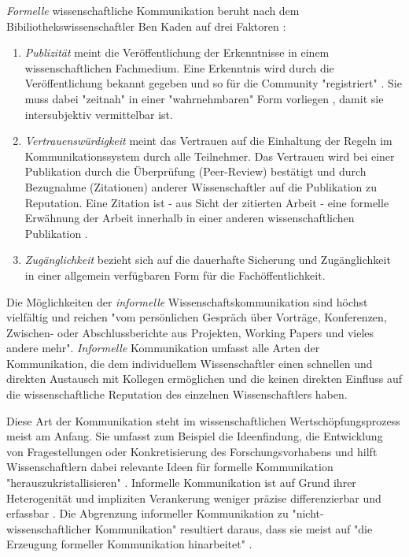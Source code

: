 \textit{Formelle} wissenschaftliche Kommunikation beruht nach dem Bibiliothekswissenschaftler Ben Kaden auf drei Faktoren \cite{kaden_2009_library}:
\begin{enumerate}
\item \textit{Publizität} meint die Veröffentlichung der Erkenntnisse in einem wissenschaftlichen Fachmedium. Eine Erkenntnis wird durch die Veröffentlichung bekannt gegeben und so für die Community "registriert" \cite{kaden_2009_library}. Sie muss dabei "zeitnah" in einer "wahrnehmbaren" Form vorliegen \cite{Schimank_2012}, damit sie intersubjektiv vermittelbar ist.
\item \textit{Vertrauenswürdigkeit} meint das Vertrauen auf die Einhaltung der Regeln im Kommunikationssystem durch alle Teilnehmer. Das Vertrauen wird bei einer Publikation durch die Überprüfung (Peer-Review) bestätigt und durch Bezugnahme (Zitationen) anderer Wissenschaftler auf die Publikation zu Reputation. Eine Zitation ist - aus Sicht der zitierten Arbeit - eine formelle Erwähnung der Arbeit innerhalb in einer anderen wissenschaftlichen Publikation \cite{weller2011twitter}.
\item \textit{Zugänglichkeit} bezieht sich auf die dauerhafte Sicherung und Zugänglichkeit in einer allgemein verfügbaren Form für die Fachöffentlichkeit.
\end{enumerate}

Die Möglichkeiten der \textit{informelle} Wissenschaftskommunikation sind höchst vielfältig und reichen "vom persönlichen Gespräch über Vorträge, Konferenzen, Zwischen- oder Abschlussberichte aus Projekten, Working Papers und vieles andere mehr"\cite{Hanekop_2014}. \textit{Informelle} Kommunikation umfasst alle Arten der Kommunikation, die dem individuellem Wissenschaftler einen schnellen und direkten Austausch mit Kollegen ermöglichen und die keinen direkten Einfluss auf die wissenschaftliche Reputation des einzelnen Wissenschaftlers haben.

Diese Art der Kommunikation steht im wissenschaftlichen Wertschöpfungsprozess meist am Anfang. Sie umfasst zum Beispiel die Ideenfindung, die Entwicklung von Fragestellungen oder Konkretisierung des Forschungsvorhabens und hilft Wissenschaftlern dabei relevante Ideen für formelle Kommunikation "herauszukristallisieren" \cite{Hanekop_2014}. Informelle Kommunikation ist auf Grund ihrer Heterogenität und impliziten Verankerung weniger präzise differenzierbar und erfassbar \cite{kaden_2009_library}. Die Abgrenzung informeller Kommunikation zu "nicht-wissenschaftlicher Kommunikation" resultiert daraus, dass sie meist auf "die Erzeugung formeller Kommunikation hinarbeitet" \cite{kaden_2009_library}.

